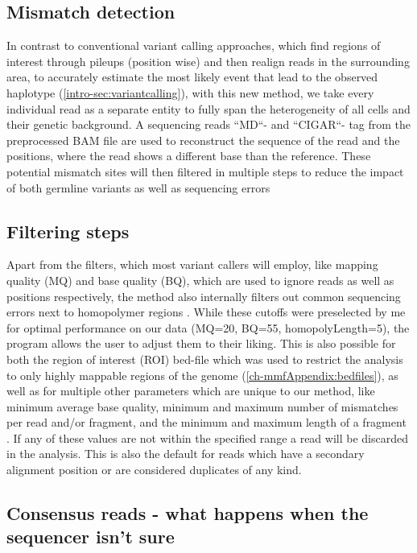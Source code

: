 \subsection{Mismatch detection}
In contrast to conventional variant calling approaches, which find regions of interest through pileups (position wise) and then realign reads in the surrounding area, to accurately estimate the most likely event that lead to the observed haplotype (\autoref{intro-sec:variantcalling}), with this new method, we take every individual read as a separate entity to fully span the heterogeneity of all cells and their genetic background. A sequencing reads ``MD``- and ``CIGAR``- tag from the preprocessed BAM file are used to reconstruct the sequence of the read and the positions, where the read shows a different base than the reference. These potential mismatch sites will then filtered in multiple steps to reduce the impact of both germline variants as well as sequencing errors

\subsection{Filtering steps}
Apart from the filters, which most variant callers will employ, like mapping quality (MQ) and base quality (BQ), which are used to ignore reads as well as positions respectively, the method also internally filters out common sequencing errors next to homopolymer regions \cite{Heydari2019}. While these cutoffs were preselected by me for optimal performance on our data (MQ=20, BQ=55, homopolyLength=5), the program allows the user to adjust them to their liking.
This is also possible for both the region of interest (ROI) bed-file which was used to restrict the analysis to only highly mappable regions of the genome (\autoref{ch-mmfAppendix:bedfiles}), as well as for multiple other parameters which are unique to our method, like minimum average base quality, minimum and maximum number of mismatches per read and/or fragment, and the minimum and maximum length of a fragment \cite{Hudecova2021}. If any of these values are not within the specified range a read will be discarded in the analysis. This is also the default for reads which have a secondary alignment position or are considered duplicates of any kind.

\subsection[Consensus reads]{Consensus reads - what happens when the sequencer isn't sure}
\label{mmf-sec:consensus}


